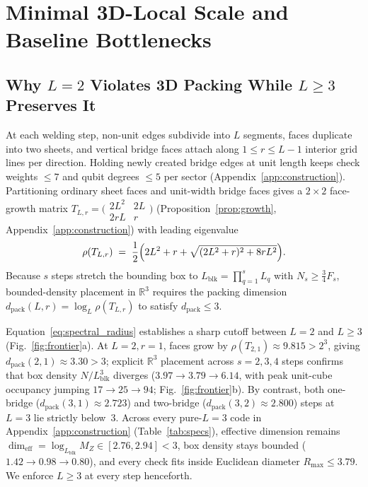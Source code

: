 \documentclass[aps,prx,reprint,superscriptaddress,nofootinbib,floatfix]{revtex4-2}
\begin{document}
\section{Minimal 3D-Local Scale and Baseline Bottlenecks}
\label{sec:scale}

\subsection{Why \texorpdfstring{$L = 2$}{L = 2} Violates 3D Packing While \texorpdfstring{$L \ge 3$}{L >= 3} Preserves It}

At each welding step, non-unit edges subdivide into $L$ segments, faces duplicate into two sheets, and vertical bridge faces attach along $1 \le r \le L - 1$ interior grid lines per direction. Holding newly created bridge edges at unit length keeps check weights $\le 7$ and qubit degrees $\le 5$ per sector (Appendix~\ref{app:construction}). Partitioning ordinary sheet faces and unit-width bridge faces gives a $2 \times 2$ face-growth matrix $T_{L,r} = \bigl(\begin{smallmatrix} 2L^2 & 2L \\ 2rL & r \end{smallmatrix}\bigr)$ (Proposition~\ref{prop:growth}, Appendix~\ref{app:construction}) with leading eigenvalue
\begin{equation}
  \rho(T_{L,r}) \;=\; \frac{1}{2}\Bigl(2L^2 + r + \sqrt{(2L^2 + r)^2 + 8rL^2}\Bigr).
  \label{eq:spectral_radius}
\end{equation}
Because $s$ steps stretch the bounding box to $L_{\mathrm{blk}} = \prod_{q=1}^s L_q$ with $N_s \ge \frac{3}{4}F_s$, bounded-density placement in $\mathbb{R}^3$ requires the packing dimension $d_{\mathrm{pack}}(L, r) = \log_L \rho(T_{L,r})$ to satisfy $d_{\mathrm{pack}} \le 3$.

Equation~\eqref{eq:spectral_radius} establishes a sharp cutoff between $L = 2$ and $L \ge 3$ (Fig.~\ref{fig:frontier}a). At $L = 2, r = 1$, faces grow by $\rho(T_{2,1}) \approx 9.815 > 2^3$, giving $d_{\mathrm{pack}}(2, 1) \approx 3.30 > 3$; explicit $\mathbb{R}^3$ placement across $s = 2, 3, 4$ steps confirms that box density $N/L_{\mathrm{blk}}^3$ diverges ($3.97 \to 3.79 \to 6.14$, with peak unit-cube occupancy jumping $17 \to 25 \to 94$; Fig.~\ref{fig:frontier}b). By contrast, both one-bridge ($d_{\mathrm{pack}}(3, 1) \approx 2.723$) and two-bridge ($d_{\mathrm{pack}}(3, 2) \approx 2.800$) steps at $L = 3$ lie strictly below~$3$. Across every pure-$L = 3$ code in Appendix~\ref{app:construction} (Table~\ref{tab:specs}), effective dimension remains $\dim_{\mathrm{eff}} = \log_{L_{\mathrm{blk}}} M_Z \in [2.76, 2.94] < 3$, box density stays bounded ($1.42 \to 0.98 \to 0.80$), and every check fits inside Euclidean diameter $R_{\max} \le 3.79$. We enforce $L \ge 3$ at every step henceforth.
\end{document}
